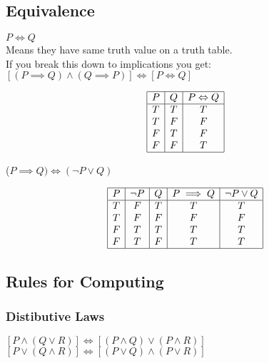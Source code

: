 \documentclass[a4paper]{article}
\begin{document}
\subsection{Equivalence}
$P \Leftrightarrow Q$	
\\
Means they have same truth value on a truth table.
\\
If you break this down to implications you get:
\\
$[(P \implies Q) \land (Q \implies P)] \Leftrightarrow [P \Leftrightarrow Q]$
\begin{center}
	\begin{displaymath}
		\begin{array}{|c|c|c|}
			\hline
			P & Q & P \Leftrightarrow Q \\ 
			\hline
			T & T & T\\
			T & F & F\\
			F & T & F\\
			F & F & T\\
			\hline
		\end{array}
	\end{displaymath}
\end{center}


($P \implies Q) \Leftrightarrow (\lnot P \lor Q)$ 
\begin{center}
	\begin{displaymath}
		\begin{array}{|c|c|c|c|c|}
			\hline
			P & \lnot P & Q & P \implies Q & \lnot P \lor Q\\ 
			\hline
			T & F & T & T & T\\
			T & F & F & F & F\\
			F & T & T & T & T\\
			F & T & F & T & T\\
			\hline
		\end{array}
	\end{displaymath}
\end{center}

\subsection{Rules for Computing}

\subsubsection{Distibutive Laws}
$[P \land (Q \lor R)]\Leftrightarrow[(P \land Q) \lor (P \land R)]$\\
$[P \lor (Q \land R)]\Leftrightarrow[(P \lor Q) \land (P \lor R)]$
\end{document}
